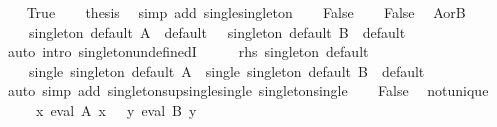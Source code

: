 \begin{isabellebody}
\ \ \isamarkupfalse%
\ True\ \isamarkupfalse%
\ \isamarkupfalse%
\ {\isacharquery}{\kern0pt}thesis\ \isamarkupfalse%
\ {\isacharparenleft}{\kern0pt}simp\ add{\isacharcolon}{\kern0pt}\ single{\isacharunderscore}{\kern0pt}singleton{\isacharparenright}{\kern0pt}\isanewline
{}\isamarkupfalse%
\isanewline
\ \ \isamarkupfalse%
\ False\isanewline
\ \ \isamarkupfalse%
\ False\ \isamarkupfalse%
\ A{\isacharunderscore}{\kern0pt}or{\isacharunderscore}{\kern0pt}B{\isacharcolon}{\kern0pt}\isanewline
\ \ \ \ {\isachardoublequoteopen}singleton\ default\ A\ {\isacharequal}{\kern0pt}\ default\ {\isacharparenleft}{\kern0pt}{\isacharparenright}{\kern0pt}\ {\isasymor}\ singleton\ default\ B\ {\isacharequal}{\kern0pt}\ default\ {\isacharparenleft}{\kern0pt}{\isacharparenright}{\kern0pt}{\isachardoublequoteclose}\isanewline
\ \ \ \ \isamarkupfalse%
\ {\isacharparenleft}{\kern0pt}auto\ intro{\isacharbang}{\kern0pt}{\isacharcolon}{\kern0pt}\ singleton{\isacharunderscore}{\kern0pt}undefinedI{\isacharparenright}{\kern0pt}\isanewline
\ \ \isamarkupfalse%
\ \isamarkupfalse%
\ rhs{\isacharcolon}{\kern0pt}\ {\isachardoublequoteopen}singleton\ default\isanewline
\ \ \ \ {\isacharparenleft}{\kern0pt}single\ {\isacharparenleft}{\kern0pt}singleton\ default\ A{\isacharparenright}{\kern0pt}\ {\isasymsqunion}\ single\ {\isacharparenleft}{\kern0pt}singleton\ default\ B{\isacharparenright}{\kern0pt}{\isacharparenright}{\kern0pt}\ {\isacharequal}{\kern0pt}\ default\ {\isacharparenleft}{\kern0pt}{\isacharparenright}{\kern0pt}{\isachardoublequoteclose}\isanewline
\ \ \ \ \isamarkupfalse%
\ {\isacharparenleft}{\kern0pt}auto\ simp\ add{\isacharcolon}{\kern0pt}\ singleton{\isacharunderscore}{\kern0pt}sup{\isacharunderscore}{\kern0pt}single{\isacharunderscore}{\kern0pt}single\ singleton{\isacharunderscore}{\kern0pt}single{\isacharparenright}{\kern0pt}\isanewline
\ \ \isamarkupfalse%
\ False\ \isamarkupfalse%
\ not{\isacharunderscore}{\kern0pt}unique{\isacharcolon}{\kern0pt}\isanewline
\ \ \ \ {\isachardoublequoteopen}{\isasymnot}\ {\isacharparenleft}{\kern0pt}{\isasymexists}{\isacharbang}{\kern0pt}x{\isachardot}{\kern0pt}\ eval\ A\ x{\isacharparenright}{\kern0pt}\ {\isasymor}\ {\isasymnot}\ {\isacharparenleft}{\kern0pt}{\isasymexists}{\isacharbang}{\kern0pt}y{\isachardot}{\kern0pt}\ eval\ B\ y{\isacharparenright}{\kern0pt}{\isachardoublequoteclose}\ \isamarkupfalse%

\end{isabellebody}
